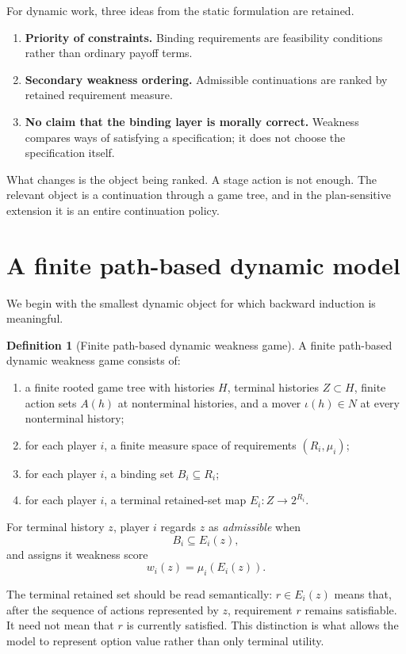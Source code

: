 \documentclass[11pt]{article}
\theoremstyle{definition}
\newtheorem{definition}[theorem]{Definition}
\begin{document}
For dynamic work, three ideas from the static formulation are retained.
\begin{enumerate}[label=(\roman*)]
\item \textbf{Priority of constraints.} Binding requirements are feasibility conditions rather than ordinary payoff terms.
\item \textbf{Secondary weakness ordering.} Admissible continuations are ranked by retained requirement measure.
\item \textbf{No claim that the binding layer is morally correct.} Weakness compares ways of satisfying a specification; it does not choose the specification itself.
\end{enumerate}

What changes is the object being ranked. A stage action is not enough. The relevant object is a continuation through a game tree, and in the plan-sensitive extension it is an entire continuation policy.

\section{A finite path-based dynamic model}

We begin with the smallest dynamic object for which backward induction is meaningful.

\begin{definition}[Finite path-based dynamic weakness game]
A finite path-based dynamic weakness game consists of:
\begin{enumerate}[label=(\alph*)]
\item a finite rooted game tree with histories $H$, terminal histories $Z\subset H$, finite action sets $A(h)$ at nonterminal histories, and a mover $\iota(h)\in N$ at every nonterminal history;
\item for each player $i$, a finite measure space of requirements $(R_i,\mu_i)$;
\item for each player $i$, a binding set $B_i\subseteq R_i$;
\item for each player $i$, a terminal retained-set map $E_i:Z\to 2^{R_i}$.
\end{enumerate}
For terminal history $z$, player $i$ regards $z$ as \emph{admissible} when
\[
B_i\subseteq E_i(z),
\]
and assigns it weakness score
\[
w_i(z)=\mu_i(E_i(z)).
\]
\end{definition}

The terminal retained set should be read semantically: $r\in E_i(z)$ means that, after the sequence of actions represented by $z$, requirement $r$ remains satisfiable. It need not mean that $r$ is currently satisfied. This distinction is what allows the model to represent option value rather than only terminal utility.
\end{document}
